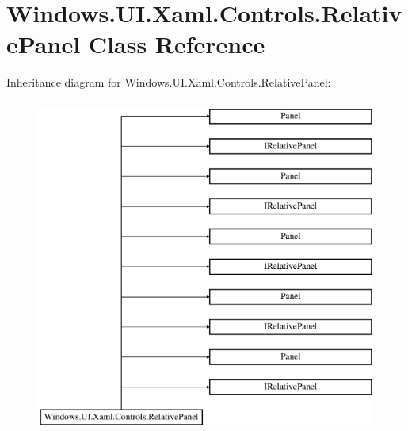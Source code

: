 \hypertarget{class_windows_1_1_u_i_1_1_xaml_1_1_controls_1_1_relative_panel}{}\section{Windows.\+U\+I.\+Xaml.\+Controls.\+Relative\+Panel Class Reference}
\label{class_windows_1_1_u_i_1_1_xaml_1_1_controls_1_1_relative_panel}
Inheritance diagram for Windows.\+U\+I.\+Xaml.\+Controls.\+Relative\+Panel\+:\begin{figure}[H]
\begin{center}
\leavevmode
\includegraphics[height=11.000000cm]{class_windows_1_1_u_i_1_1_xaml_1_1_controls_1_1_relative_panel}
\end{center}
\end{figure}
